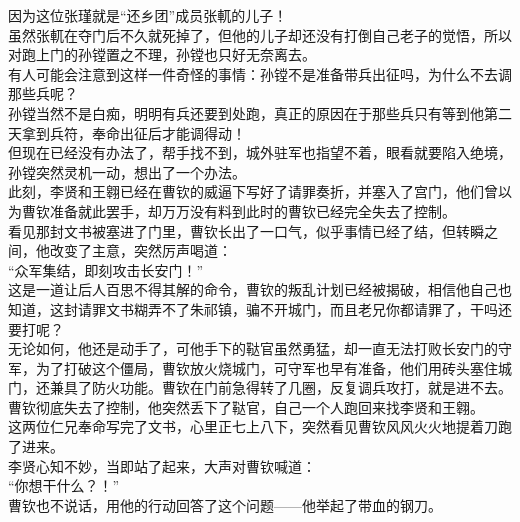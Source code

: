 \begin{multicols}{\theparacolNo}
因为这位张瑾就是“还乡团”成员张軏的儿子！\\

虽然张軏在夺门后不久就死掉了，但他的儿子却还没有打倒自己老子的觉悟，所以对跑上门的孙镗置之不理，孙镗也只好无奈离去。\\

有人可能会注意到这样一件奇怪的事情：孙镗不是准备带兵出征吗，为什么不去调那些兵呢？\\

孙镗当然不是白痴，明明有兵还要到处跑，真正的原因在于那些兵只有等到他第二天拿到兵符，奉命出征后才能调得动！\\

但现在已经没有办法了，帮手找不到，城外驻军也指望不着，眼看就要陷入绝境，孙镗突然灵机一动，想出了一个办法。\\

此刻，李贤和王翱已经在曹钦的威逼下写好了请罪奏折，并塞入了宫门，他们曾以为曹钦准备就此罢手，却万万没有料到此时的曹钦已经完全失去了控制。\\

看见那封文书被塞进了门里，曹钦长出了一口气，似乎事情已经了结，但转瞬之间，他改变了主意，突然厉声喝道：\\

“众军集结，即刻攻击长安门！”\\

这是一道让后人百思不得其解的命令，曹钦的叛乱计划已经被揭破，相信他自己也知道，这封请罪文书糊弄不了朱祁镇，骗不开城门，而且老兄你都请罪了，干吗还要打呢？\\

无论如何，他还是动手了，可他手下的鞑官虽然勇猛，却一直无法打败长安门的守军，为了打破这个僵局，曹钦放火烧城门，可守军也早有准备，他们用砖头塞住城门，还兼具了防火功能。曹钦在门前急得转了几圈，反复调兵攻打，就是进不去。\\

曹钦彻底失去了控制，他突然丢下了鞑官，自己一个人跑回来找李贤和王翱。\\

这两位仁兄奉命写完了文书，心里正七上八下，突然看见曹钦风风火火地提着刀跑了进来。\\

李贤心知不妙，当即站了起来，大声对曹钦喊道：\\

“你想干什么？！”\\

曹钦也不说话，用他的行动回答了这个问题——他举起了带血的钢刀。\\


\end{multicols}
